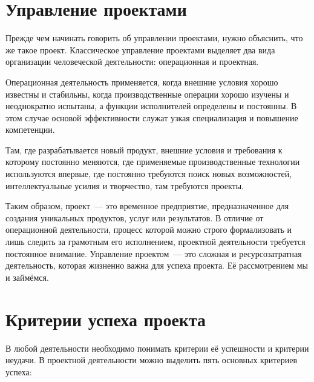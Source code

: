 \documentclass{../../text-style}
\begin{document}
\maketitle
\thispagestyle{empty}


\section{Управление проектами}

Прежде чем начинать говорить об управлении проектами, нужно объяснить, что же такое проект. Классическое управление проектами выделяет два вида организации человеческой деятельности: операционная и проектная.

Операционная деятельность применяется, когда внешние условия хорошо известны и стабильны, когда производственные операции хорошо изучены и неоднократно испытаны, а функции исполнителей определены и постоянны. В этом случае основой эффективности служат узкая специализация и повышение компетенции.

Там, где разрабатывается новый продукт, внешние условия и требования к которому постоянно меняются, где применяемые производственные технологии используются впервые, где постоянно требуются поиск новых возможностей, интеллектуальные усилия и творчество, там требуются проекты.

Таким образом, проект~--- это временное предприятие, предназначенное для создания уникальных продуктов, услуг или результатов. В отличие от операционной деятельности, процесс которой можно строго формализовать и лишь следить за грамотным его исполнением, проектной деятельности требуется постоянное внимание. Управление проектом~--- это сложная и ресурсозатратная деятельность, которая жизненно важна для успеха проекта. Её рассмотрением мы и займёмся.

\section{Критерии успеха проекта}

В любой деятельности необходимо понимать критерии её успешности и критерии неудачи. В проектной деятельности можно выделить пять основных критериев успеха:
\end{document}

